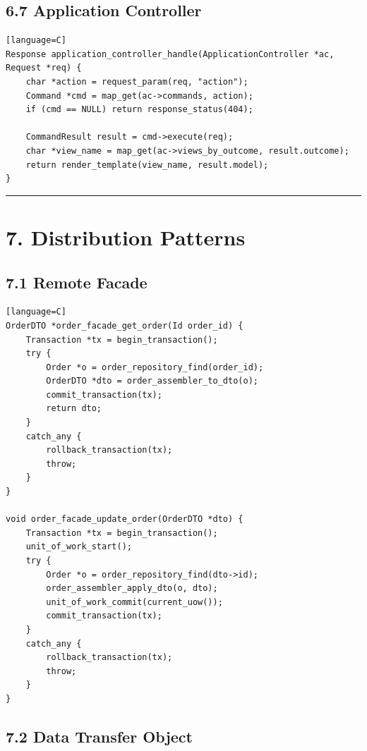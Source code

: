 \documentclass[11pt]{article}
\begin{document}
\subsection{6.7 Application Controller}\label{application-controller}

\begin{verbatim}[language=C]
Response application_controller_handle(ApplicationController *ac, Request *req) {
    char *action = request_param(req, "action");
    Command *cmd = map_get(ac->commands, action);
    if (cmd == NULL) return response_status(404);

    CommandResult result = cmd->execute(req);
    char *view_name = map_get(ac->views_by_outcome, result.outcome);
    return render_template(view_name, result.model);
}
\end{verbatim}

\begin{center}\rule{0.5\linewidth}{0.5pt}\end{center}

\section{7. Distribution Patterns}\label{distribution-patterns}

\subsection{7.1 Remote Facade}\label{remote-facade}

\begin{verbatim}[language=C]
OrderDTO *order_facade_get_order(Id order_id) {
    Transaction *tx = begin_transaction();
    try {
        Order *o = order_repository_find(order_id);
        OrderDTO *dto = order_assembler_to_dto(o);
        commit_transaction(tx);
        return dto;
    }
    catch_any {
        rollback_transaction(tx);
        throw;
    }
}

void order_facade_update_order(OrderDTO *dto) {
    Transaction *tx = begin_transaction();
    unit_of_work_start();
    try {
        Order *o = order_repository_find(dto->id);
        order_assembler_apply_dto(o, dto);
        unit_of_work_commit(current_uow());
        commit_transaction(tx);
    }
    catch_any {
        rollback_transaction(tx);
        throw;
    }
}
\end{verbatim}

\subsection{7.2 Data Transfer Object}\label{data-transfer-object}
\end{document}
